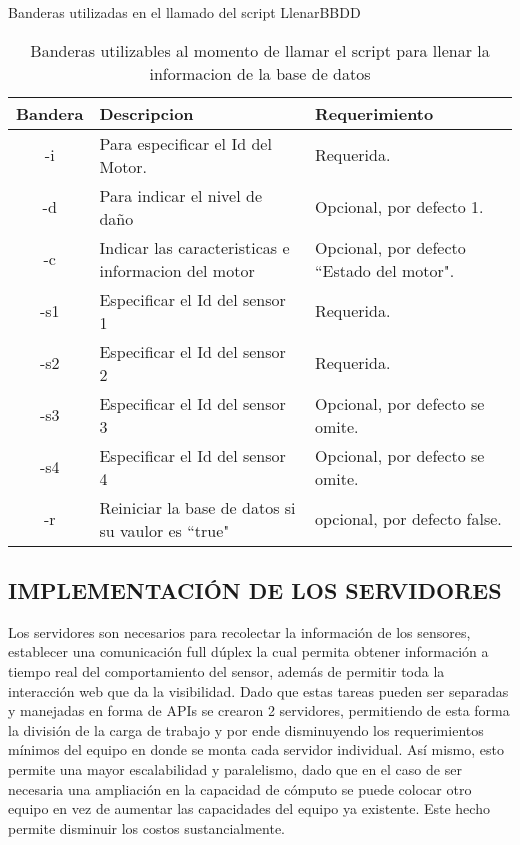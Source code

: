 \begin{table}[ht]
        \begin{center}
            Banderas utilizadas en el llamado del script LlenarBBDD \\

            \vspace{0.3cm}
            \begin{tabular}{|c|p{7cm}|p{5cm}|}
                \hline
                Bandera & Descripcion & Requerimiento \\\hline
                -i & Para especificar el Id del Motor. & Requerida.\\\hline
                -d & Para indicar el nivel de daño  & Opcional, por defecto 1.\\\hline
                -c & Indicar las caracteristicas e informacion del motor & Opcional, por defecto ``Estado del motor".\\\hline
                -s1& Especificar el Id del sensor 1 &Requerida.\\\hline
                -s2& Especificar el Id del sensor 2 &Requerida.\\\hline
                -s3& Especificar el Id del sensor 3 & Opcional, por defecto se omite.\\\hline
                -s4& Especificar el Id del sensor 4  &Opcional, por defecto se omite.\\\hline
                -r & Reiniciar la base de datos si su vaulor es ``true"& opcional, por defecto false.
                \\\hline
            \end{tabular}
        \end{center}
        \caption[Banderas Script para el llenado de la BBDD]{
        Banderas utilizables al momento de llamar el script para llenar la informacion
        de la base de datos}
        \label{tab:BanderasLLenadoBBDD}
    \end{table}


\subsection{IMPLEMENTACIÓN DE LOS SERVIDORES}

    Los servidores son necesarios para recolectar la información de los sensores,
    establecer una comunicación full dúplex la cual permita obtener información
    a tiempo real del comportamiento del sensor, además de permitir toda la
    interacción web que da la visibilidad. Dado que estas tareas pueden ser
    separadas y manejadas en forma de APIs se crearon 2 servidores, permitiendo
    de esta forma la división de la carga de trabajo y por ende disminuyendo los
    requerimientos mínimos del equipo en donde se monta cada servidor individual.
    Así mismo, esto permite una mayor escalabilidad y paralelismo, dado que en el
    caso de ser necesaria una ampliación en la capacidad de cómputo se puede colocar
    otro equipo en vez de aumentar las capacidades del equipo ya existente. Este
    hecho permite disminuir los costos sustancialmente.

